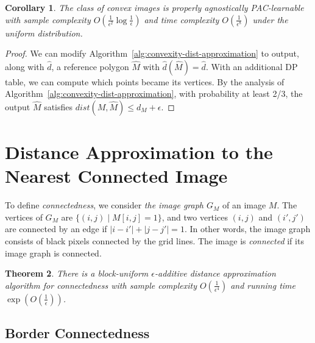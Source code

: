 \documentclass[11pt,english]{article}
\newtheorem{theorem}{Theorem}[section]
\newtheorem{corollary}[theorem]{Corollary}
\numberwithin{figure}{section}
\newcommand{\dis}{dist}
\newcommand{\mydelta}{\epsilon} \newcommand{\bigdelta}{{\epsilon_0}} \newcommand{\dsquares}{d_{\rm squares}}
\newcommand{\dout}{\hat{d}}
\begin{document}
\begin{corollary}\label{cor:convexity-agnostic-learner}
The class of convex images is properly agnostically PAC-learnable with sample complexity  $O(\frac{1}{\mydelta^2}\log\frac{1}{\mydelta})$ and time complexity $O(\frac{1}{\mydelta^8})$ under the uniform distribution.
\end{corollary}
\begin{proof}
We can modify Algorithm~\ref{alg:convexity-dist-approximation} to output, along with $\dout$, a reference polygon $\hat{M}$ with $\dout(\hat{M})=\dout$. With an additional DP table, we can compute which points became its vertices. By the analysis of Algorithm~\ref{alg:convexity-dist-approximation}, with probability at least 2/3, the output $\hat{M}$ satisfies $\dis(M,\hat{M})\leq d_M+\mydelta.$
\end{proof}
\fi




\section{Distance Approximation to the Nearest Connected Image}\label{sec:connectedness}
To define {\em connectedness}, we consider {\em the  image graph $G_M$} of an image $M$. The vertices of $G_M$ are
$\{(i,j)\mid M[i,j]=1\}$, and two vertices $(i,j)$ and $(i',j')$ are connected by an edge if $|i-i'|+|j-j'|=1$.
In other words, the image
graph consists of black pixels connected by the grid lines. The image is
{\em connected} if its image graph is connected.

\begin{theorem}\label{thm:connectedness_dist_appr}
There is a block-uniform $\mydelta$-additive distance approximation algorithm for connectedness with sample complexity $O(\frac{1}{\mydelta^{4}})$ and running time $\exp\left(O\left(\frac 1 \mydelta \right)\right)$.
\end{theorem}

\ifnum{}
\subsection{Border Connectedness}\label{sec:border_connectedness}
\fi
\end{document}
